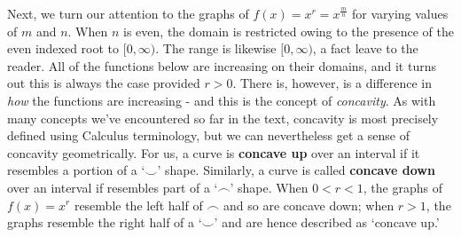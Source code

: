 \documentclass{ximera}
\begin{document}


Next, we turn our attention to the graphs of $f(x) =x^r =  x^{\frac{m}{n}}$ for varying values of $m$ and $n$.  When $n$ is even, the domain is restricted owing to the presence of the even indexed root to $[0, \infty)$. The range is likewise $[0, \infty)$, a fact leave to the reader.  All of the functions below are increasing on their domains, and it turns out this is always the case provided $r>0$.  There is, however, is a difference in \textit{how} the functions are increasing - and this is the concept of \textit{concavity}.  As with many concepts we've encountered so far in the text,  concavity is most precisely defined using Calculus terminology,  but we can nevertheless get a sense of concavity geometrically.   For us,  a curve is  \textbf{concave up} over an interval if it resembles a  portion of a `$\smile$' shape.  Similarly, a curve is called  \textbf{concave down} over an interval if  resembles part of a `$\frown$' shape. When $0 < r < 1$, the graphs of $f(x) = x^r$ resemble the left half of $\frown$ and so are concave down;  when $r>1$, the graphs resemble the right half of a `$\smile$' and are hence described as `concave up.'
\end{document}
